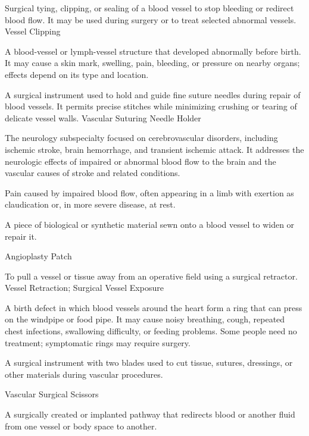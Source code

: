  Surgical tying, clipping, or sealing of a blood vessel to stop bleeding or redirect blood flow. It may be used during surgery or to treat selected abnormal vessels.
\synonyms
Vessel Clipping

 A blood-vessel or lymph-vessel structure that developed abnormally before birth. It may cause a skin mark, swelling, pain, bleeding, or pressure on nearby organs; effects depend on its type and location.

 A surgical instrument used to hold and guide fine suture needles during repair of blood vessels. It permits precise stitches while minimizing crushing or tearing of delicate vessel walls.
\synonyms
Vascular Suturing Needle Holder

 The neurology subspecialty focused on cerebrovascular disorders, including
ischemic stroke, brain hemorrhage, and transient ischemic attack. It addresses the neurologic
effects of impaired or abnormal blood flow to the brain and the vascular causes of stroke
and related conditions.

 Pain caused by impaired blood flow, often appearing in a limb with exertion as claudication or, in more severe disease, at rest.

 A piece of biological or synthetic material sewn onto a blood vessel to widen or repair it.

\synonyms
Angioplasty Patch

 To pull a vessel or tissue away from an operative field using a surgical retractor.
\synonyms
Vessel Retraction; Surgical Vessel Exposure

 A birth defect in which blood vessels around the heart form a ring that can press on the windpipe or food pipe. It may cause noisy breathing, cough, repeated chest infections, swallowing difficulty, or feeding problems. Some people need no treatment; symptomatic rings may require surgery.

 A surgical instrument with two blades used to cut tissue, sutures, dressings, or other materials
during vascular procedures.

\synonyms
Vascular Surgical Scissors

 A surgically created or implanted pathway that redirects blood or another fluid from one vessel or body space to another.


